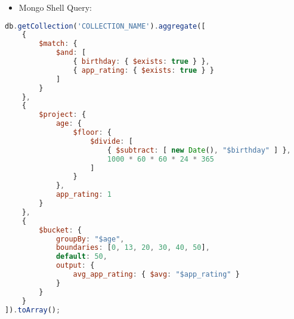 \begin{itemize}
    \item Mongo Shell Query:
\end{itemize}
\begin{lstlisting}[language=JavaScript]
db.getCollection('COLLECTION_NAME').aggregate([
    { 
        $match: { 
            $and: [
                { birthday: { $exists: true } }, 
                { app_rating: { $exists: true } }
            ]
        } 
    },
    { 
        $project: { 
            age: { 
                $floor: { 
                    $divide: [
                        { $subtract: [ new Date(), "$birthday" ] },
                        1000 * 60 * 60 * 24 * 365
                    ]
                }
            },
            app_rating: 1 
        } 
    },
    { 
        $bucket: {
            groupBy: "$age",
            boundaries: [0, 13, 20, 30, 40, 50],
            default: 50,
            output: { 
                avg_app_rating: { $avg: "$app_rating" }
            }
        }
    }
]).toArray();
       
    
\end{lstlisting}





